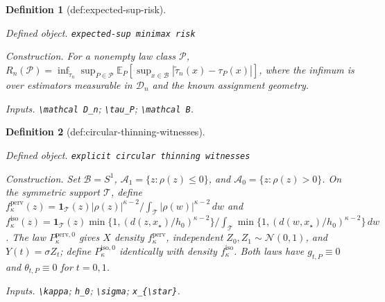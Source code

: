 \documentclass{article}
\newtheorem{definition}{Definition}
\begin{document}
\begin{definition}[def:expected-sup-risk]\label{def:expected-sup-risk}
\par\smallskip\noindent\emph{Defined object.} \texttt{expected-\allowbreak{}sup minimax risk}
\par\smallskip\noindent\emph{Construction.} For a nonempty law class \(\mathcal P\), \(R_n(\mathcal P)=\inf_{\widetilde\tau_n}\sup_{P\in\mathcal P}\mathbb E_P[\sup_{x\in\mathcal B}|\widetilde\tau_n(x)-\tau_P(x)|]\), where the infimum is over estimators measurable in \(\mathcal D_n\) and the known assignment geometry.
\par\smallskip\noindent\emph{Inputs.} \texttt{\textbackslash{}\allowbreak{}mathcal D\_\allowbreak{}n}; \texttt{\textbackslash{}\allowbreak{}tau\_\allowbreak{}P}; \texttt{\textbackslash{}\allowbreak{}mathcal B}.
\end{definition}

\begin{definition}[def:circular-thinning-witnesses]\label{def:circular-thinning-witnesses}
\par\smallskip\noindent\emph{Defined object.} \texttt{explicit circular thinning witnesses}
\par\smallskip\noindent\emph{Construction.} Set \(\mathcal B=S^1\), \(\mathcal A_1=\{z:\rho(z)\le0\}\), and \(\mathcal A_0=\{z:\rho(z)>0\}\). On the symmetric support \(\mathcal T\), define \(f_{\kappa}^{\mathrm{perv}}(z)=\mathbf 1_{\mathcal T}(z)|\rho(z)|^{\kappa-2}/\int_{\mathcal T}|\rho(w)|^{\kappa-2}\,dw\) and \(f_{\kappa}^{\mathrm{iso}}(z)=\mathbf 1_{\mathcal T}(z)\min\{1,(d(z,x_{\star})/h_0)^{\kappa-2}\}/\int_{\mathcal T}\min\{1,(d(w,x_{\star})/h_0)^{\kappa-2}\}\,dw\). The law \(P_{\kappa}^{\mathrm{perv},0}\) gives \(X\) density \(f_{\kappa}^{\mathrm{perv}}\), independent \(Z_0,Z_1\sim\mathcal N(0,1)\), and \(Y(t)=\sigma Z_t\); define \(P_{\kappa}^{\mathrm{iso},0}\) identically with density \(f_{\kappa}^{\mathrm{iso}}\). Both laws have \(g_{t,P}\equiv0\) and \(\theta_{t,P}\equiv0\) for \(t=0,1\).
\par\smallskip\noindent\emph{Inputs.} \texttt{\textbackslash{}\allowbreak{}kappa}; \texttt{h\_\allowbreak{}0}; \texttt{\textbackslash{}\allowbreak{}sigma}; \texttt{x\_\allowbreak{}\{\textbackslash{}\allowbreak{}star\}\allowbreak{}}.
\end{definition}
\end{document}
